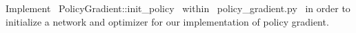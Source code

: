 \item {}

Implement ~PolicyGradient::init_policy~ within ~policy_gradient.py~ in order to initialize a network and optimizer for our implementation of policy gradient.